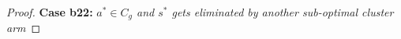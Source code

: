\begin{proof}


\textbf{Case b22:} \textit{$a^{*}\in C_{g}$ and $s^{*}$ gets eliminated by another sub-optimal cluster arm} 


\end{proof}
